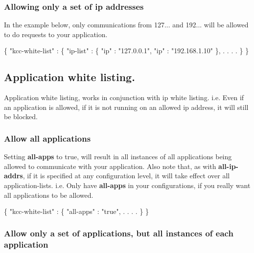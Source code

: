 \subsubsection*{Allowing only a set of ip addresses}

In the example below, only communications from 127... and 192... will be allowed to do requests to your application. 
\begin{DoxyCode}
\{
  \textcolor{stringliteral}{"kcc-white-list"} : \{
    \textcolor{stringliteral}{"ip-list"}      : \{
      \textcolor{stringliteral}{"ip"} : \textcolor{stringliteral}{"127.0.0.1"},
      \textcolor{stringliteral}{"ip"} : \textcolor{stringliteral}{"192.168.1.10"}
    \},
    .
    .
    .
    .
  \}
\}
\end{DoxyCode}


\subsection*{Application white listing.}

Application white listing, works in conjunction with ip white listing. i.\-e. Even if an application is allowed, if it is not running on an allowed ip address, it will still be blocked.

\subsubsection*{Allow all applications}

Setting {\bfseries all-\/apps} to true, will result in all instances of all applications being allowed to communicate with your application. Also note that, as with {\bfseries all-\/ip-\/addrs}, if it is specified at any configuration level, it will take effect over all application-\/lists. i.\-e. Only have {\bfseries all-\/apps} in your configurations, if you really want all applications to be allowed. 
\begin{DoxyCode}
\{
  \textcolor{stringliteral}{"kcc-white-list"} : \{
    \textcolor{stringliteral}{"all-apps"}     : \textcolor{stringliteral}{"true"},
      .
      .
      .
      .
  \}
\}
\end{DoxyCode}


\subsubsection*{Allow only a set of applications, but all instances of each application}

